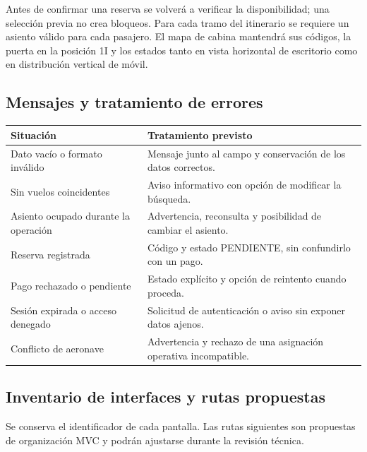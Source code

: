 \documentclass[11pt,a4paper]{article}
\begin{document}
Antes de confirmar una reserva se volverá a verificar la disponibilidad; una selección previa no crea bloqueos. Para cada tramo del itinerario se requiere un asiento válido para cada pasajero. El mapa de cabina mantendrá sus códigos, la puerta en la posición 1I y los estados tanto en vista horizontal de escritorio como en distribución vertical de móvil.

\subsection{Mensajes y tratamiento de errores}
\begin{tabularx}{\textwidth}{@{}p{4cm}X@{}}
\toprule
\textbf{Situación} & \textbf{Tratamiento previsto}\\\midrule
Dato vacío o formato inválido & Mensaje junto al campo y conservación de los datos correctos.\\
Sin vuelos coincidentes & Aviso informativo con opción de modificar la búsqueda.\\
Asiento ocupado durante la operación & Advertencia, reconsulta y posibilidad de cambiar el asiento.\\
Reserva registrada & Código y estado PENDIENTE, sin confundirlo con un pago.\\
Pago rechazado o pendiente & Estado explícito y opción de reintento cuando proceda.\\
Sesión expirada o acceso denegado & Solicitud de autenticación o aviso sin exponer datos ajenos.\\
Conflicto de aeronave & Advertencia y rechazo de una asignación operativa incompatible.\\\bottomrule
\end{tabularx}

\subsection{Inventario de interfaces y rutas propuestas}
Se conserva el identificador de cada pantalla. Las rutas siguientes son propuestas de organización MVC y podrán ajustarse durante la revisión técnica.
\end{document}
